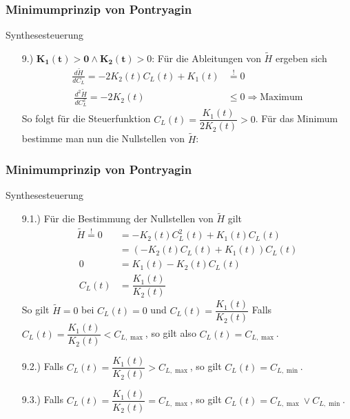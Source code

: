 \documentclass[aspectratio=169]{beamer}
\begin{document}
\begin{frame}
  \frametitle{Minimumprinzip von Pontryagin}
    \tiny
  \begin{block}{Synthesesteuerung}  
      \begin{enumerate}
\item[9.)] $\mathbf{K_1(t) > 0 \wedge K_2(t)} > 0$: Für die Ableitungen von $\tilde{H}$ ergeben sich
\[\begin{split}
\frac{d \tilde{H}}{d C_L} = - 2 K_2(t) C_L(t) + K_1(t) &\stackrel{!}{=} 0 \\\
\frac{d^2 \tilde{H}}{d C_L^2} = - 2 K_2(t) &\leq 0 \Rightarrow \text{Maximum}
\end{split}\]
So folgt für die Steuerfunktion $C_L(t) = \dfrac{K_1(t)}{2 K_2(t)} > 0$. Für das Minimum bestimme man nun die Nullstellen von $\tilde{H}$:
        \end{enumerate}
      \end{block}
\end{frame}


\begin{frame}
  \frametitle{Minimumprinzip von Pontryagin}
    \tiny
  \begin{block}{Synthesesteuerung}  
        \begin{enumerate}
\item[9.1.)] Für die Bestimmung der Nullstellen von $\tilde{H}$ gilt
\[\begin{split}
\tilde{H} \stackrel{!}{=} 0 &= - K_2(t) C_L^2(t) + K_1(t)C_L(t) \\\
&= (- K_2(t) C_L(t) + K_1(t)) C_L(t) \\\
0 &= K_1(t) - K_2(t)C_L(t) \\\
C_L(t) &= \dfrac{K_1(t)}{K_2(t)}
\end{split}\]
So gilt $\tilde{H} = 0$ bei $C_L(t) = 0$ und $C_L(t) = \dfrac{K_1(t)}{K_2(t)}$ Falls $C_L(t) = \dfrac{K_1(t)}{K_2(t)} < C_{L,\max}$, so gilt also $C_L(t) = C_{L, \max}$.
%
\item[9.2.)] Falls $C_L(t) = \dfrac{K_1(t)}{K_2(t)} > C_{L,\max}$, so gilt $C_L(t) = C_{L,\min}$.
\item[9.3.)] Falls $C_L(t) = \dfrac{K_1(t)}{K_2(t)} = C_{L,\max}$, so gilt $C_L(t) = C_{L,\max} \vee C_{L,\min}$.
    \end{enumerate}
      \end{block}
\end{frame}
\end{document}

